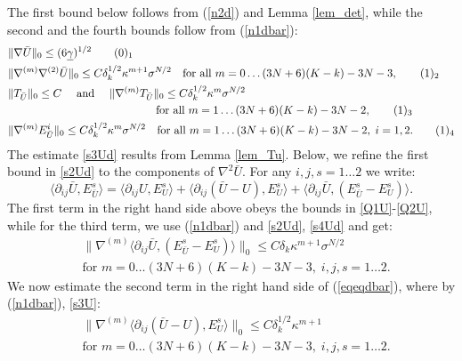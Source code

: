 \documentclass[reqno,twoside,11pt]{amsart}
\numberwithin{equation}{section}
\theoremstyle{plain}
\theoremstyle{definition}
\begin{document}
The first bound below follows from (\ref{n2d}) and Lemma
\ref{lem_det}, while the second and the fourth bounds follow from (\ref{n1dbar}):
\begin{align*}
& \|\nabla \bar U\|_0\leq (6\underline\gamma)^{1/2}
\tag*{(\theequation)$_1$}\refstepcounter{equation} \label{s1Ud} \\
& \|\nabla^{(m)}\nabla^{(2)} \bar U\|_0\leq 
C\delta_{k}^{1/2}\kappa^{m+1}\sigma^{N/2} \quad\mbox{for all } m=0\ldots (3N+6)(K-k)-3N-3,
\tag*{(\theequation)$_2$} \label{s2Ud} \\
& \|T_{\bar U}\|_0\leq C \quad\mbox{ and }\quad
\|\nabla^{(m)}T_{\bar U}\|_0\leq C\delta_k^{1/2}\kappa^m\sigma^{N/2}
\\ & \qquad\qquad \qquad\qquad\qquad \qquad \hspace{1mm}
\quad\mbox{for all } m=1\ldots (3N+6)(K-k)-3N-2,
\tag*{(\theequation)$_3$} \label{s3Ud} \\
& \|\nabla^{(m)}E^i_{\bar  U}\|_0\leq
C\delta_k^{1/2}\kappa^m\sigma^{N/2}\quad\mbox{for all } m=1\ldots (3N+6)(K-k)-3N-2,\;i=1,2. 
\tag*{(\theequation)$_4$} \label{s4Ud} 
\end{align*}
The estimate \ref{s3Ud} results from Lemma \ref{lem_Tu}.
Below,  we refine the first bound in \ref{s2Ud} to the components of
$\nabla^2\bar U$. For any $i,j,s=1\ldots 2$ we write:
\begin{equation}\label{eqeqdbar}
\langle \partial_{ij}\bar U, E^s_{\bar U}\rangle = \langle \partial_{ij}U, E^s_{U}\rangle
+ \langle\partial_{ij}(\bar U-U), E^s_{U}\rangle +
\langle\partial_{ij}\bar U, (E^s_{\bar U}-E^s_{U})\rangle. 
\end{equation}
The first term in the right hand side above obeys the bounds in
\ref{Q1U}-\ref{Q2U}, while for the third term, we use
(\ref{n1dbar}) and \ref{s2Ud}, \ref{s4Ud} and get:
\begin{equation*}
\begin{split}
& \|\nabla^{(m)}\langle\partial_{ij}\bar U, (E^s_{\bar U}-E^s_{U})\rangle\|_0 \leq
C\delta_k\kappa^{m+1}\sigma^{N/2}
\\ & \mbox{for }m=0\ldots (3N+6)(K-k)-3N-3,\; i,j,s=1\ldots 2.
\end{split}
\end{equation*}
We now estimate the second term in the right hand
side of (\ref{eqeqdbar}), where by (\ref{n1dbar}), \ref{s3U}:
\begin{equation*}
\begin{split}
& \|\nabla^{(m)}\langle\partial_{ij}(\bar U-U), E^s_{U}\rangle\|_0 
\leq  C\delta_k^{1/2}\kappa^{m+1} \\ & \mbox{for } m=0\ldots (3N+6)(K-k)-3N-3,\; i,j,s=1\ldots 2.
\end{split}
\end{equation*}
\end{document}
